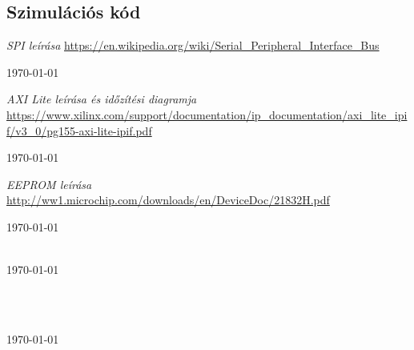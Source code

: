 \documentclass[a4paper,11pt]{article}
\begin{document}


\subsection{Szimulációs kód}



\pagebreak
\begin{thebibliography}{}


\textit{SPI leírása}
\url{https://en.wikipedia.org/wiki/Serial_Peripheral_Interface_Bus}

\today


\textit{AXI Lite leírása és időzítési diagramja}\\
\url{https://www.xilinx.com/support/documentation/ip_documentation/axi_lite_ipif/v3_0/pg155-axi-lite-ipif.pdf}

\today


\textit{EEPROM leírása}\\
\url{http://ww1.microchip.com/downloads/en/DeviceDoc/21832H.pdf}

\today


\textit{}\\
\url{}
\today


\textit{}\\



\textit{}\\
\url{}
\today


\end{thebibliography}
\end{document}
